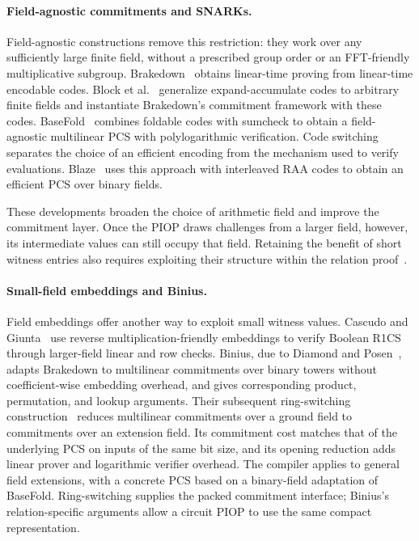 \paragraph{Field-agnostic commitments and SNARKs.}
Field-agnostic constructions remove this restriction: they work
over any sufficiently large finite field, without a prescribed
group order or an FFT-friendly multiplicative subgroup.
Brakedown~\cite{crypto/GolovnevLSTW23} obtains linear-time proving
from linear-time encodable codes.
Block et al.~\cite{crypto/BlockFKTWZ24} generalize
expand-accumulate codes to arbitrary finite fields and instantiate
Brakedown's commitment framework with these codes.
BaseFold~\cite{crypto/ZeilbergerCF24} combines foldable codes with
sumcheck to obtain a field-agnostic multilinear PCS with
polylogarithmic verification.
Code switching~\cite{jacm/RonZewiR24} separates the choice of an
efficient encoding from the mechanism used to verify evaluations.
Blaze~\cite{eurocrypt/BrehmCFRRZ25} uses this approach with
interleaved RAA codes to obtain an efficient PCS over binary fields.

These developments broaden the choice of arithmetic field and
improve the commitment layer. Once the PIOP draws challenges from
a larger field, however, its intermediate values can still occupy
that field. Retaining the benefit of short witness entries also
requires exploiting their structure within the relation
proof~\cite{eurocrypt/DiamondP25,iacr/BagadDDT25}.

\paragraph{Small-field embeddings and Binius.}
Field embeddings offer another way to exploit small witness values.
Cascudo and Giunta~\cite{iacr/CascudoG21} use reverse
multiplication-friendly embeddings to verify Boolean R1CS through
larger-field linear and row checks.
Binius, due to Diamond and Posen~\cite{eurocrypt/DiamondP25},
adapts Brakedown to multilinear commitments over binary towers
without coefficient-wise embedding overhead, and gives corresponding
product, permutation, and lookup arguments.
Their subsequent ring-switching construction~\cite{eurocrypt/DiamondP26}
reduces multilinear commitments over a ground field to commitments
over an extension field. Its commitment cost matches that of the
underlying PCS on inputs of the same bit size, and its opening
reduction adds linear prover and logarithmic verifier overhead.
The compiler applies to general field extensions, with a concrete
PCS based on a binary-field adaptation of BaseFold.
Ring-switching supplies the packed commitment interface; Binius's
relation-specific arguments allow a circuit PIOP to use the same
compact representation.

